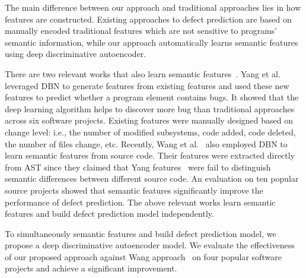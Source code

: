 The main difference between our approach and traditional approaches lies in how features are constructed. Existing approaches to defect prediction are based on manually encoded traditional features which are not sensitive to programs' semantic information, while our approach automatically learns semantic features using deep discriminative autoencoder. %

There are two relevant works that also learn semantic features~\cite{yang2015deep,wang2016automatically}. Yang et al.~\cite{yang2015deep} leveraged DBN to generate features from existing features and used these new features to predict whether a program element contains bugs. It showed that the deep learning algorithm helps to discover more bug than traditional approaches across six software projects. Existing features were manually designed based on change level: i.e., the number of modified subsystems, code added, code deleted, the number of files change, etc. Recently, Wang et al.~\cite{wang2016automatically} also employed DBN to learn semantic features from source code. Their features were extracted directly from AST since they claimed that Yang features~\cite{yang2015deep} were fail to distinguish semantic differences between different source code. An evaluation on ten popular source projects showed that semantic features significantly improve the performance of defect prediction. The above relevant works learn semantic features and build defect prediction model independently.%

To simultaneously semantic features and build defect prediction model, we propose a deep discriminative autoencoder model.  We evaluate the effectiveness of our proposed approach against Wang approach~\cite{wang2012compressed} on four popular software projects and achieve a significant improvement.

